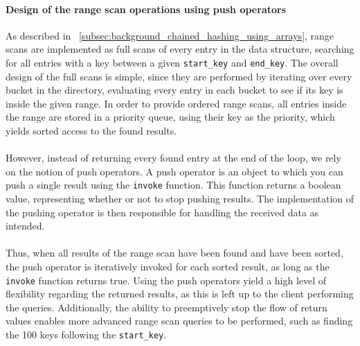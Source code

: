 \documentclass[11pt]{report} %
\begin{document}
\paragraph{Design of the range scan operations using push operators}
As described in ~\ref{subsec:background_chained_hashing_using_arrays}, range scans are implemented as full scans of every entry in the data structure, searching for all entries with a key between a given \verb|start_key| and \verb|end_key|. The overall design of the full scans is simple, since they are performed by iterating over every bucket in the directory, evaluating every entry in each bucket to see if its key is inside the given range. In order to provide ordered range scans, all entries inside the range are stored in a priority queue, using their key as the priority, which yields sorted access to the found results. \\
\\
However, instead of returning every found entry at the end of the loop, we rely on the notion of push operators. A push operator is an object to which you can push a single result using the \verb|invoke| function. This function returns a boolean value, representing whether or not to stop pushing results. The implementation of the pushing operator is then responsible for handling the received data as intended. \\
\\
Thus, when all results of the range scan have been found and have been sorted, the push operator is iteratively invoked for each sorted result, as long as the \verb|invoke| function returns true. Using the push operators yield a high level of flexibility regarding the returned results, as this is left up to the client performing the queries. Additionally, the ability to preemptively stop the flow of return values enables more advanced range scan queries to be performed, such as finding the 100 keys following the \verb|start_key|. 
\end{document}
